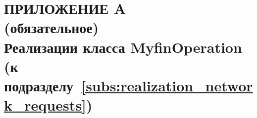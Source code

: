 \renewcommand{\thefigure}{\Asbuk{section}.\arabic{figure}}
\renewcommand{\thetable}{\Asbuk{section}.\arabic{table}}
\renewcommand{\thelstlisting}{\Asbuk{section}.\arabic{lstlisting}}

\fancyhf{} %
\fancyfoot[R]{\thepage}
\setlength{\footskip}{-2.5mm}
\setlength{\headheight}{8mm}

\thispagestyle{plain}
\section*{%
  ПРИЛОЖЕНИЕ A \\
  (обязательное) \\
  Реализации класса MyfinOperation
  (к подразделу~\ref{subs:realization_network_requests})
}

\setcounter{section}{1}
\setcounter{figure}{0}
\setcounter{table}{0}
\setcounter{lstlisting}{0}

\vspace{-\baselineskip}

\pagebreak